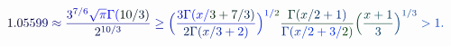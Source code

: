 \documentclass[12pt]{article}
\begin{document}
\makeatletter
\renewcommand*{\@textcolor}[3]{%
  \protect\leavevmode
  \begingroup
    \color#1{#2}#3%
  \endgroup
}
\makeatother
\begin{displaymath}
\mathcolor[RGB]{0,0,15}{1} \mathcolor[RGB]{0,0,30}{.} \mathcolor[RGB]{0,0,45}{0} \mathcolor[RGB]{0,0,60}{5} \mathcolor[RGB]{0,0,75}{5} \mathcolor[RGB]{0,0,90}{9} \mathcolor[RGB]{0,0,105}{9} \mathcolor[RGB]{0,0,120}{\approx} \mathcolor[RGB]{0,0,135}{\frac { \mathcolor[RGB]{0,0,150}{3} ^ { \mathcolor[RGB]{0,0,165}{7} \mathcolor[RGB]{0,0,180}{/} \mathcolor[RGB]{0,0,195}{6} } \mathcolor[RGB]{0,0,210}{\sqrt { \mathcolor[RGB]{0,0,225}{\pi} } } \mathcolor[RGB]{0,0,240}{\Gamma} \mathcolor[RGB]{0,0,255}{(} \mathcolor[RGB]{0,15,0}{1} \mathcolor[RGB]{0,15,15}{0} \mathcolor[RGB]{0,15,30}{/} \mathcolor[RGB]{0,15,45}{3} \mathcolor[RGB]{0,15,60}{)} } { \mathcolor[RGB]{0,15,75}{2} ^ { \mathcolor[RGB]{0,15,90}{1} \mathcolor[RGB]{0,15,105}{0} \mathcolor[RGB]{0,15,120}{/} \mathcolor[RGB]{0,15,135}{3} } } } \mathcolor[RGB]{0,15,150}{\geq} \mathcolor[RGB]{0,15,165}{\Big(} \mathcolor[RGB]{0,15,180}{\frac { \mathcolor[RGB]{0,15,195}{3} \mathcolor[RGB]{0,15,210}{\Gamma} \mathcolor[RGB]{0,15,225}{(} \mathcolor[RGB]{0,15,240}{x} \mathcolor[RGB]{0,15,255}{/} \mathcolor[RGB]{0,30,0}{3} \mathcolor[RGB]{0,30,15}{+} \mathcolor[RGB]{0,30,30}{7} \mathcolor[RGB]{0,30,45}{/} \mathcolor[RGB]{0,30,60}{3} \mathcolor[RGB]{0,30,75}{)} } { \mathcolor[RGB]{0,30,90}{2} \mathcolor[RGB]{0,30,105}{\Gamma} \mathcolor[RGB]{0,30,120}{(} \mathcolor[RGB]{0,30,135}{x} \mathcolor[RGB]{0,30,150}{/} \mathcolor[RGB]{0,30,165}{3} \mathcolor[RGB]{0,30,180}{+} \mathcolor[RGB]{0,30,195}{2} \mathcolor[RGB]{0,30,210}{)} } } \mathcolor[RGB]{0,30,225}{\Big)} ^ { \mathcolor[RGB]{0,30,240}{1} \mathcolor[RGB]{0,30,255}{/} \mathcolor[RGB]{0,45,0}{2} } \mathcolor[RGB]{0,45,15}{\frac { \mathcolor[RGB]{0,45,30}{\Gamma} \mathcolor[RGB]{0,45,45}{(} \mathcolor[RGB]{0,45,60}{x} \mathcolor[RGB]{0,45,75}{/} \mathcolor[RGB]{0,45,90}{2} \mathcolor[RGB]{0,45,105}{+} \mathcolor[RGB]{0,45,120}{1} \mathcolor[RGB]{0,45,135}{)} } { \mathcolor[RGB]{0,45,150}{\Gamma} \mathcolor[RGB]{0,45,165}{(} \mathcolor[RGB]{0,45,180}{x} \mathcolor[RGB]{0,45,195}{/} \mathcolor[RGB]{0,45,210}{2} \mathcolor[RGB]{0,45,225}{+} \mathcolor[RGB]{0,45,240}{3} \mathcolor[RGB]{0,45,255}{/} \mathcolor[RGB]{0,60,0}{2} \mathcolor[RGB]{0,60,15}{)} } } \mathcolor[RGB]{0,60,30}{\Big(} \mathcolor[RGB]{0,60,45}{\frac { \mathcolor[RGB]{0,60,60}{x} \mathcolor[RGB]{0,60,75}{+} \mathcolor[RGB]{0,60,90}{1} } { \mathcolor[RGB]{0,60,105}{3} } } \mathcolor[RGB]{0,60,120}{\Big)} ^ { \mathcolor[RGB]{0,60,135}{1} \mathcolor[RGB]{0,60,150}{/} \mathcolor[RGB]{0,60,165}{3} } \mathcolor[RGB]{0,60,180}{>} \mathcolor[RGB]{0,60,195}{1} \mathcolor[RGB]{0,60,210}{.}
\end{displaymath}
\end{document}

